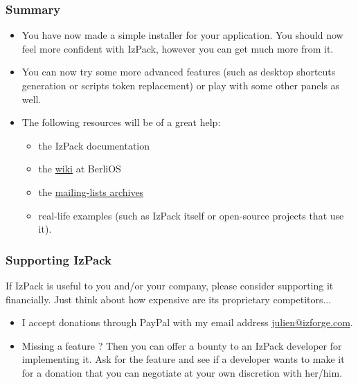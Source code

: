 \documentclass[compress,10pt]{beamer}
\begin{document}
\begin{frame}

\frametitle{Summary}

\begin{itemize}

  \item You have now made a simple installer for your application. You should
  now feel more confident with IzPack, however you can get much more from it.

  \item You can now try some more advanced features (such as desktop shortcuts
  generation or scripts token replacement) or play with some other panels as
  well.

  \item The following resources will be of a great help:
  \begin{itemize}

    \item the IzPack documentation

    \item the \href{http://openfacts.berlios.de/index-en.phtml?title=IzPack}{
    wiki} at BerliOS

    \item the \href{http://developer.berlios.de/mail/?group_id=1408}{
    mailing-lists archives}

    \item real-life examples (such as IzPack itself or open-source projects that
    use it).

  \end{itemize}

\end{itemize}

\end{frame}

\begin{frame}

\frametitle{Supporting IzPack}

If IzPack is useful to you and/or your company, please consider supporting it
financially. Just think about how expensive are its proprietary competitors...

\begin{itemize}

  \item I accept donations through PayPal with my email address
  \small{\url{julien@izforge.com}}.

  \item Missing a feature ? Then you can offer a bounty to an IzPack developer
  for implementing it. Ask for the feature and see if a developer wants to make
  it for a donation that you can negotiate at your own discretion with her/him.

\end{itemize}

\end{frame}
\end{document}
